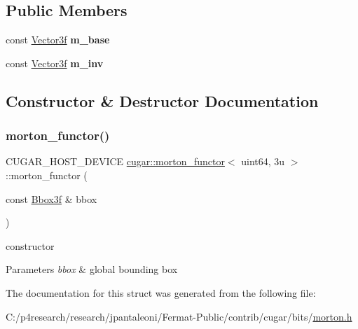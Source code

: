 \subsection*{Public Members}
\begin{DoxyCompactItemize}
\item 
\mbox{\label{structcugar_1_1morton__functor_3_01uint64_00_013u_01_4_a3a9052afcd9ffd9ce8da5ab510aab9c0}} 
const \hyperlink{structcugar_1_1_vector}{Vector3f} {\bfseries m\+\_\+base}
\item 
\mbox{\label{structcugar_1_1morton__functor_3_01uint64_00_013u_01_4_a8a82f97c6bf1c19d9fb9d5aeea3e51a1}} 
const \hyperlink{structcugar_1_1_vector}{Vector3f} {\bfseries m\+\_\+inv}
\end{DoxyCompactItemize}


\subsection{Constructor \& Destructor Documentation}
\mbox{\label{structcugar_1_1morton__functor_3_01uint64_00_013u_01_4_a6e419b3856553261495352b81ed4e189}} 
\subsubsection{\texorpdfstring{morton\+\_\+functor()}{morton\_functor()}}
{\footnotesize\ttfamily C\+U\+G\+A\+R\+\_\+\+H\+O\+S\+T\+\_\+\+D\+E\+V\+I\+CE \hyperlink{structcugar_1_1morton__functor}{cugar\+::morton\+\_\+functor}$<$ uint64, 3u $>$\+::morton\+\_\+functor (\begin{DoxyParamCaption}\item[{const \hyperlink{structcugar_1_1_bbox}{Bbox3f} \&}]{bbox }\end{DoxyParamCaption})\hspace{0.3cm}{\ttfamily [inline]}}

constructor


\begin{DoxyParams}{Parameters}
{\em bbox} & global bounding box \\
\hline
\end{DoxyParams}


The documentation for this struct was generated from the following file\+:\begin{DoxyCompactItemize}
\item 
C\+:/p4research/research/jpantaleoni/\+Fermat-\/\+Public/contrib/cugar/bits/\hyperlink{morton_8h}{morton.\+h}\end{DoxyCompactItemize}
